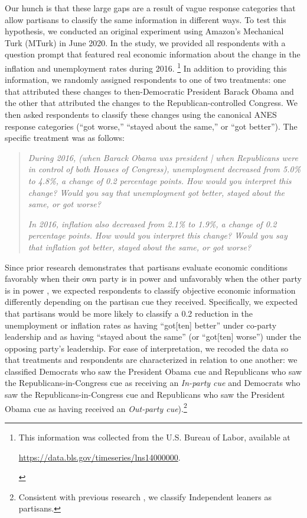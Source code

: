 \documentclass[12pt, letterpaper]{article}
\begin{document}


Our hunch is that these large gaps are a result of vague response categories that allow partisans to classify the same information in different ways. To test this hypothesis, we conducted an original experiment using Amazon's Mechanical Turk (MTurk) in June 2020. In the study, we provided all respondents with a question prompt that featured real economic information about the change in the inflation and unemployment rates during 2016. \footnote{This information was collected from the U.S. Bureau of Labor, available at \begin{footnotesize} \url{https://data.bls.gov/timeseries/lns14000000}.\end{footnotesize}} In addition to providing this information, we randomly assigned respondents to one of two treatments: one that attributed these changes to then-Democratic President Barack Obama and the other that attributed the changes to the Republican-controlled Congress. We then asked respondents to classify these changes using the canonical ANES response categories (``got worse,'' ``stayed about the same,'' or ``got better''). The specific treatment was as follows: 

\begin{quotation} 
\noindent \textit{During 2016, (when Barack Obama was president | when Republicans were in control of both Houses of Congress), unemployment decreased from 5.0\% to 4.8\%, a change of 0.2 percentage points. How would you interpret this change? Would you say that unemployment got better, stayed about the same, or got worse?}

\bigskip

\noindent \textit{In 2016, inflation also decreased from 2.1\% to 1.9\%, a change of 0.2 percentage points. How would you interpret this change? Would you say that inflation got better, stayed about the same, or got worse?}

\end{quotation}

Since prior research demonstrates that partisans evaluate economic conditions favorably when their own party is in power and unfavorably when the other party is in power \citep[e.g.][]{bartels_2002,bisgaard2015bias}, we expected respondents to classify objective economic information differently depending on the partisan cue they received. Specifically, we expected that partisans would be more likely to classify a 0.2 reduction in the unemployment or inflation rates as having ``got[ten] better'' under co-party leadership and as having ``stayed about the same'' (or ``got[ten] worse'') under the opposing party's leadership. For ease of interpretation, we recoded the data so that treatments and respondents are characterized in relation to one another: we classified Democrats who saw the President Obama cue and Republicans who saw the Republicans-in-Congress cue as receiving an \textit{In-party cue} and Democrats who saw the Republicans-in-Congress cue and Republicans who saw the President Obama cue as having received an \textit{Out-party cue}).\footnote{Consistent with previous research \citep[e.g.,][]{keithetal_1992}, we classify Independent leaners as partisans.} 
\end{document}
